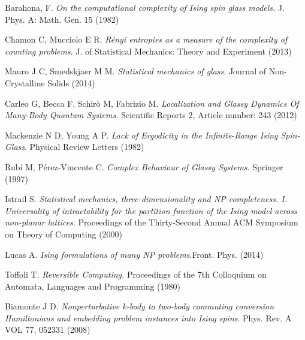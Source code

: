 \begin{thebibliography}{9}
  Barahona, F. \textit{On the computational complexity of Ising spin glass models.} J. Phys. A: Math. Gen. 15 (1982)

  Chamon C, Mucciolo E R. \textit{Rényi entropies as a measure of the complexity of counting problems}. J. of Statistical Mechanics: Theory and Experiment (2013)

  Mauro J C, Smedskjaer M M. \textit{Statistical mechanics of glass}. Journal of Non-Crystalline Solids (2014)

  Carleo G, Becca F, Schirò M, Fabrizio M.
  \textit{Localization and Glassy Dynamics Of
Many-Body Quantum Systems.} Scientific Reports 2, Article number: 243 (2012)

  Mackenzie N D, Young A P. \textit{Lack of Ergodicity in the Infinite-Range Ising Spin-Glass}. Physical Review Letters (1982)

  Rubí M, Pérez-Vincente C. \textit{Complex Behaviour
of Glassy Systems}. Springer (1997)

  Istrail S.
  \textit{Statistical mechanics, three-dimensionality and NP-completeness. I. Universality of intractability for the partition function of the Ising model across non-planar lattices}. Proceedings of the Thirty-Second Annual ACM Symposium on Theory of Computing (2000)

  Lucas A. \textit{Ising formulations of many NP problems}.Front. Phys. (2014)

  Toffoli T. \textit{Reversible Computing.} Proceedings of the 7th Colloquium on Automata, Languages and Programming (1980)

  Biamonte J D.
  \textit{Nonperturbative k-body to two-body commuting conversion Hamiltonians and embedding problem instances into Ising spins}. Phys. Rev. A VOL 77, 052331 (2008)

\end{thebibliography}
